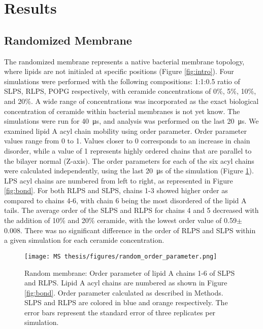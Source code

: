 \documentclass[10pt, letterpaper]{article}
\begin{document}
\newpage
\section{Results}
\subsection{Randomized Membrane}
\par The randomized membrane represents a native bacterial membrane topology, where lipids are not initialed at specific positions (Figure {\ref{fig:intro}}). Four simulations were performed with the following compositions: 1:1:0.5 ratio of SLPS, RLPS, POPG respectively, with ceramide concentrations of 0\%, 5\%, 10\%, and 20\%. A wide range of concentrations was incorporated as the exact biological concentration of ceramide within bacterial membranes is not yet know. The simulations were run for \SI{40}{\micro\second}, and analysis was performed on the last \SI{20}{\micro\second}. 
We examined lipid A acyl chain mobility using order parameter. Order parameter values range from 0 to 1. Values closer to 0 corresponds to an increase in chain disorder, while a value of 1 represents highly ordered chains that are parallel to the bilayer normal (Z-axis). The order parameters for each of the six acyl chains were calculated independently, using the last \SI{20}{\micro\second} of the simulation (Figure \ref{fig:ran_order}). 
LPS acyl chains are numbered from left to right, as represented in Figure \ref{fig:bond}. For both RLPS and SLPS, chains 1-3 showed higher order as compared to chains 4-6, with chain 6 being the most disordered of the lipid A tails. The average order of the SLPS and RLPS for chains 4 and 5 decreased with the addition of 10\% and 20\% ceramide, with the lowest order value of 0.59$\pm$ 0.008. There was no significant difference in the order of RLPS and SLPS within a given simulation for each ceramide concentration. 


\begin{figure}[H]
  \centerline{\texttt{[image: MS thesis/figures/random\_order\_parameter.png]}}
  \caption[Random Membrane: Order Parameter]{Random membrane: Order parameter of lipid A chains 1-6 of SLPS and RLPS. Lipid A acyl chains are numbered as shown in Figure \ref{fig:bond}. Order parameter calculated as described in Methods. SLPS and RLPS are colored in blue and orange respectively. The error bars represent the standard error of three replicates per simulation. }
  \label{fig:ran_order}
\end{figure}
\end{document}
